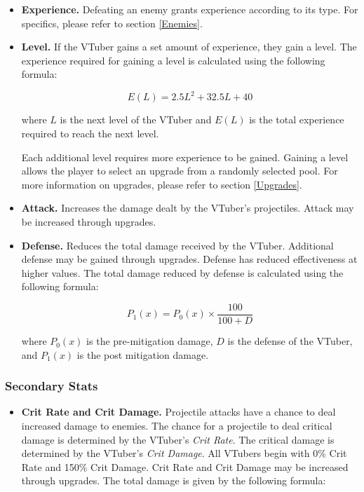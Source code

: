 \documentclass[10pt, a4paper]{article}
\begin{document}
\begin{multicols}{2}
\begin{itemize}
  	\item \textbf{Experience.} Defeating an enemy grants experience according to its type. For specifics, please refer to section \ref{Enemies}. 
  	
  	\item \textbf{Level.} If the VTuber gains a set amount of experience, they gain a level. The experience required for gaining a level is calculated using the following formula:
  	
  	\[E(L) = 2.5L^2 + 32.5L + 40\]
  	
  	where $L$ is the next level of the VTuber and $E(L)$ is the total experience required to reach the next level.
  	
  	Each additional level requires more experience to be gained. Gaining a level allows the player to select an upgrade from a randomly selected pool. For more information on upgrades, please refer to section \ref{Upgrades}.
  	
  	\item \textbf{Attack.} Increases the damage dealt by the VTuber's projectiles. Attack may be increased through upgrades.

  	\item\textbf{Defense.} Reduces the total damage received by the VTuber. Additional defense may be gained through upgrades. Defense has reduced effectiveness at higher values. The total damage reduced by defense is calculated using the following formula:
  	
  	\[P_1(x) = P_0(x) \times \frac{100}{100+D}\]
  	
  	where $P_0(x)$ is the pre-mitigation damage, $D$ is the defense of the VTuber, and $P_1(x)$ is the post mitigation damage.
  	
  	\end{itemize}
  	
  	\subsubsection{Secondary Stats}
  	
  	\begin{itemize}
  	 \item \textbf{Crit Rate and Crit Damage.} Projectile attacks have a chance to deal increased damage to enemies. The chance for a projectile to deal critical damage is determined by the VTuber's \textit{Crit Rate}. The critical damage is determined by the VTuber's \textit{Crit Damage}. All VTubers begin with 0\% Crit Rate and 150\% Crit Damage. Crit Rate and Crit Damage may be increased through upgrades. The total damage is given by the following formula:


\end{itemize}
\end{multicols}
\end{document}
